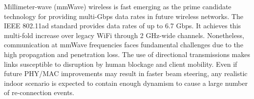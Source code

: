 Millimeter-wave (mmWave) wireless is fast emerging as the prime
candidate technology for providing multi-Gbps data rates in future wireless networks.
The IEEE 802.11ad
standard 
provides data rates of up to 6.7 Gbps. 
It
achieves this multi-fold increase over legacy WiFi through
2 GHz-wide channels.
Nonetheless, communication at mmWave frequencies faces fundamental
challenges due to the high propagation and penetration loss. %
The use of directional transmissions 
makes
links susceptible to disruption by human blockage and client
mobility. 
Even if future PHY/MAC improvements may result in faster beam steering, any realistic
indoor scenario is expected to contain enough dynamism
to cause a large number of re-connection events.

